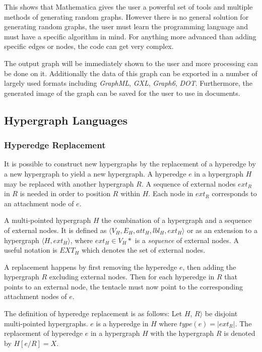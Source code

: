    

    This shows that Mathematica gives the user a powerful set of tools and multiple methods of generating random graphs. However there is no general solution for generating random graphs, the user must learn the programming language and must have a specific algorithm in mind. For anything more advanced than adding specific edges or nodes, the code can get very complex.

    The output graph will be immediately shown to the user and more processing can be done on it. Additionally the data of this graph can be exported in a number of largely used formats including \emph{GraphML}, \emph{GXL}, \emph{Graph6}, \emph{DOT}. Furthermore, the generated image of the graph can be saved for the user to use in documents.

\subsection{Hypergraph Languages}
  \subsubsection{Hyperedge Replacement}

    It is possible to construct new hypergraphs by the replacement of a hyperedge by a new hypergraph to yield a new hypergraph. A hyperedge $e$ in a hypergraph $H$ may be replaced with another hypergraph $R$. A sequence of external nodes $ext_R$ in $R$ is needed in order to position $R$ within $H$. Each node in $ext_R$ corresponds to an attachment node of $e$.

    A multi-pointed hypergraph $H$ the combination of a hypergraph and a sequence of external nodes. It is defined as $\langle V_H, E_H, att_H, lbl_H, ext_H \rangle$ or as an extension to a hypergraph $\langle H, ext_H \rangle$, where $ext_H \in V_H*$ is a \emph{sequence} of external nodes. A useful notation is $EXT_H$ which denotes the set of external nodes.

    A replacement happens by first removing the hyperedge $e$, then adding the hypergraph $R$ excluding external nodes. Then for each hyperedge in $R$ that points to an external node, the tentacle must now point to the corresponding attachment nodes of $e$.

    The definition of hyperedge replacement is as follows: Let $H$, $R \rangle$ be disjoint multi-pointed hypergraphs. $e$ is a hyperedge in $H$ where $type(e) = |ext_R|$. The replacement of hyperedge $e$ in a hypergraph $H$ with the hypergraph $R$ is denoted by $H[e/R] = X$.

